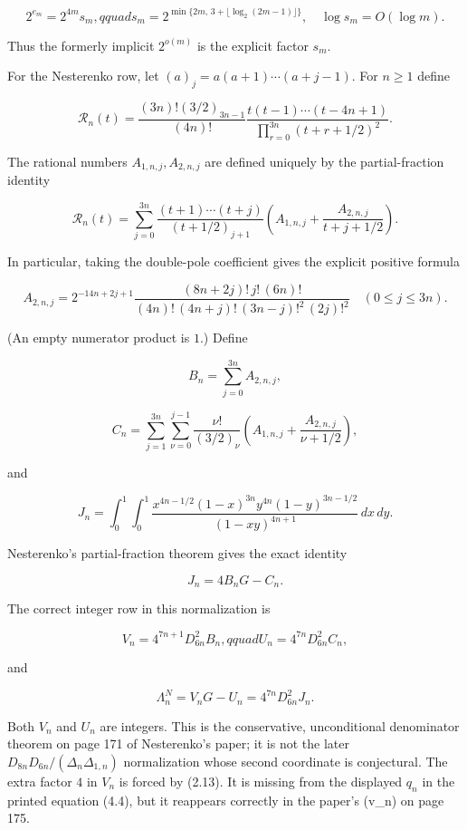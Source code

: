 \documentclass[
  11pt,
]{article}
\begin{document}
\[
 2^{e_m}=2^{4m}s_m,qquad
 s_m=2^{\min\{2m,\,3+\lfloor\log_2(2m-1)\rfloor\}},
 \quad \log s_m=O(\log m).
 \tag{2.7}
\]

Thus the formerly implicit \(2^{o(m)}\) is the explicit factor \(s_m\).

For the Nesterenko row, let \((a)_j=a(a+1)\cdots(a+j-1)\). For \(n\ge1\)
define

\[
 \mathcal R_n(t)=
 \frac{(3n)!(3/2)_{3n-1}}{(4n)!}
 \frac{t(t-1)\cdots(t-4n+1)}
      {\prod_{r=0}^{3n}(t+r+1/2)^2}.
 \tag{2.8}
\]

The rational numbers \(A_{1,n,j},A_{2,n,j}\) are defined uniquely by the
partial-fraction identity

\[
 \mathcal R_n(t)=\sum_{j=0}^{3n}
 \frac{(t+1)\cdots(t+j)}{(t+1/2)_{j+1}}
 \left(A_{1,n,j}+\frac{A_{2,n,j}}{t+j+1/2}\right).
 \tag{2.9}
\]

In particular, taking the double-pole coefficient gives the explicit
positive formula

\[
 A_{2,n,j}=2^{-14n+2j+1}
 \frac{(8n+2j)!\,j!\,(6n)!}
 {(4n)!\,(4n+j)!\,(3n-j)!^2\,(2j)!^2}
 \quad(0\le j\le3n).
 \tag{2.9a}
\]

(An empty numerator product is \(1\).) Define

\[
 B_n=\sum_{j=0}^{3n}A_{2,n,j},
 \tag{2.10}
\]

\[
 C_n=\sum_{j=1}^{3n}\sum_{\nu=0}^{j-1}
 \frac{\nu!}{(3/2)_\nu}
 \left(A_{1,n,j}+\frac{A_{2,n,j}}{\nu+1/2}\right),
 \tag{2.11}
\]

and

\[
 J_n=\int_0^1\!\int_0^1
 \frac{x^{4n-1/2}(1-x)^{3n}y^{4n}(1-y)^{3n-1/2}}
 {(1-xy)^{4n+1}}\,dx\,dy.
 \tag{2.12}
\]

Nesterenko's partial-fraction theorem gives the exact identity

\[
 J_n=4B_nG-C_n.
 \tag{2.13}
\]

The correct integer row in this normalization is

\[
 V_n=4^{7n+1}D_{6n}^2B_n,qquad
 U_n=4^{7n}D_{6n}^2C_n,
 \tag{2.14}
\]

and

\[
 \Lambda_n^N=V_nG-U_n=4^{7n}D_{6n}^2J_n.
 \tag{2.15}
\]

Both \(V_n\) and \(U_n\) are integers. This is the conservative,
unconditional denominator theorem on page 171 of Nesterenko's paper; it
is not the later \(D_{8n}D_{6n}/(\Delta_n\Delta_{1,n})\) normalization
whose second coordinate is conjectural. The extra factor \(4\) in
\(V_n\) is forced by (2.13). It is missing from the displayed \(q_n\) in
the printed equation (4.4), but it reappears correctly in the paper's
(v\_n) on page 175.
\end{document}
